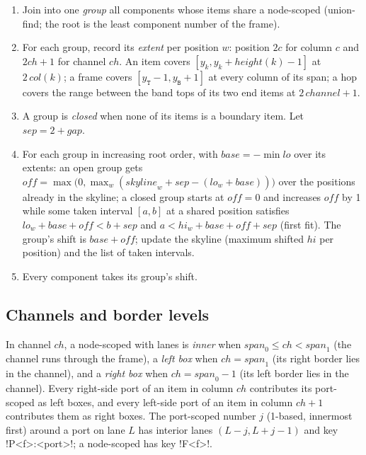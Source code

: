 \begin{algorithm}[Packing]\label{alg:pictorial-pack}
\begin{enumerate}
  \item Join into one \emph{group} all components whose items share a node-scoped \bbox{}
    (union-find; the root is the least component number of the frame).
  \item For each group, record its \emph{extent} per position $w$: position $2c$ for column $c$
    and $2\mathit{ch}+1$ for channel $\mathit{ch}$. An item covers $[y_k, y_k+\mathit{height}(k)-1]$
    at $2\,\mathit{col}(k)$; a frame covers $[y_\mathtt{T}-1, y_\mathtt{B}+1]$ at every column of
    its span; a hop covers the range between the band tops of its two end items at
    $2\,\mathit{channel}+1$.
  \item A group is \emph{closed} when none of its items is a boundary item. Let
    $\mathit{sep} = 2+\mathit{gap}$.
  \item For each group in increasing root order, with $\mathit{base} = -\min \mathit{lo}$ over
    its extents: an open group gets
    $\mathit{off} = \max\bigl(0, \max_w(\mathit{skyline}_w + \mathit{sep} - (\mathit{lo}_w +
    \mathit{base}))\bigr)$ over the positions already in the skyline; a closed group starts at
    $\mathit{off}=0$ and increases $\mathit{off}$ by 1 while some taken interval $[a,b]$ at a
    shared position satisfies $\mathit{lo}_w+\mathit{base}+\mathit{off} < b+\mathit{sep}$ and
    $a < \mathit{hi}_w+\mathit{base}+\mathit{off}+\mathit{sep}$ (first fit). The group's shift is
    $\mathit{base}+\mathit{off}$; update the skyline (maximum shifted $\mathit{hi}$ per position)
    and the list of taken intervals.
  \item Every component takes its group's shift.
\end{enumerate}
\end{algorithm}

\subsection{Channels and border levels}\label{sec:pictorial-channels}

\begin{definition}\label{def:pictorial-boxes}
In channel $\mathit{ch}$, a node-scoped \bbox{} with lanes is \emph{inner} when
$\mathit{span}_0\le\mathit{ch}<\mathit{span}_1$ (the channel runs through the frame), a
\emph{left box} when $\mathit{ch}=\mathit{span}_1$ (its right border lies in the channel), and a
\emph{right box} when $\mathit{ch}=\mathit{span}_0-1$ (its left border lies in the channel). Every
right-side port of an item in column $\mathit{ch}$ contributes its port-scoped \bboxes{} as left
boxes, and every left-side port of an item in column $\mathit{ch}+1$ contributes them as right
boxes. The port-scoped \bbox{} number $j$ (1-based, innermost first) around a port on lane $L$
has interior lanes $(L-j, L+j-1)$ and key \code!P<f>:<port>!; a node-scoped \bbox{} has key
\code!F<f>!.
\end{definition}

